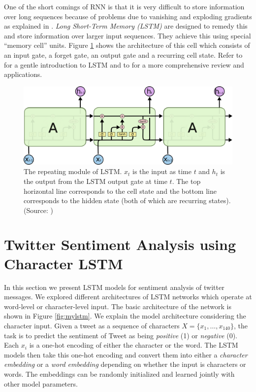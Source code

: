 \documentclass{article} %
\begin{document}
One of the short comings of RNN is that it is very difficult to store information over long sequences because of problems due to vanishing and exploding gradients as explained in \cite{hochreiter2001gradient}.
{\it Long Short-Term Memory (LSTM)} \cite{hochreiter1997long} are designed to remedy this and store information over larger input sequences.
They achieve this using special ``memory cell'' units. 
Figure \ref{fig:lstm} shows the architecture of this cell which consists of an input gate, a forget gate, an output gate and a recurring cell state. 
Refer to \cite{colah} for a gentle introduction to LSTM and to \cite{graves2012supervised} for a more comprehensive review and applications.

\begin{figure}[t]
	\centering
	\includegraphics[width=\textwidth]{figs/LSTM.png}
	\caption{The repeating module of LSTM. $x_t$ is the input as time $t$ and $h_t$ is the output from the LSTM output gate at time $t$. The top horizontal line corresponds to the cell state and the bottom line corresponds to the hidden state (both of which are recurring states).
	(Source: \cite{colah})}
	\label{fig:lstm}
\end{figure}

\section{Twitter Sentiment Analysis using Character LSTM}
In this section we present LSTM models for sentiment analysis of twitter messages. We explored different architectures of LSTM networks which operate at word-level or character-level input. The basic architecture of the network is shown in Figure \ref{fig:mylstm}.
We explain the model architecture considering the character input.
Given a tweet as a sequence of characters $X=\{x_1, \ldots, x_{140}\}$, the task is to predict the sentiment of Tweet as being {\it positive} (1) or {\it negative} (0). Each $x_i$ is a one-hot encoding of either the character or the word. The LSTM models then take this one-hot encoding and convert them into either a {\it character embedding} or a {\it word embedding} depending on whether the input is characters or words. The embeddings can be randomly initialized and learned jointly with other model parameters.
\end{document}
